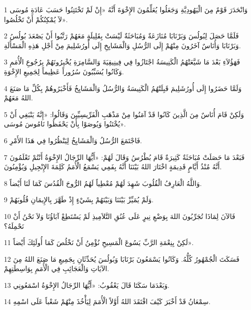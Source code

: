 \par 1 وَانْحَدَرَ قَوْمٌ مِنَ الْيَهُودِيَّةِ وَجَعَلُوا يُعَلِّمُونَ الإِخْوَةَ أَنَّهُ «إِنْ لَمْ تَخْتَتِنُوا حَسَبَ عَادَةِ مُوسَى لاَ يُمْكِنُكُمْ أَنْ تَخْلُصُوا».
\par 2 فَلَمَّا حَصَلَ لِبُولُسَ وَبَرْنَابَا مُنَازَعَةٌ وَمُبَاحَثَةٌ لَيْسَتْ بِقَلِيلَةٍ مَعَهُمْ رَتَّبُوا أَنْ يَصْعَدَ بُولُسُ وَبَرْنَابَا وَأُنَاسٌ آخَرُونَ مِنْهُمْ إِلَى الرُّسُلِ وَالْمَشَايِخِ إِلَى أُورُشَلِيمَ مِنْ أَجْلِ هَذِهِ الْمَسْأَلَةِ.
\par 3 فَهَؤُلاَءِ بَعْدَ مَا شَيَّعَتْهُمُ الْكَنِيسَةُ اجْتَازُوا فِي فِينِيقِيَةَ وَالسَّامِرَةِ يُخْبِرُونَهُمْ بِرُجُوعِ الْأُمَمِ وَكَانُوا يُسَبِّبُونَ سُرُوراً عَظِيماً لِجَمِيعِ الإِخْوَةِ.
\par 4 وَلَمَّا حَضَرُوا إِلَى أُورُشَلِيمَ قَبِلَتْهُمُ الْكَنِيسَةُ وَالرُّسُلُ وَالْمَشَايِخُ فَأَخْبَرُوهُمْ بِكُلِّ مَا صَنَعَ اللهُ مَعَهُمْ.
\par 5 وَلَكِنْ قَامَ أُنَاسٌ مِنَ الَّذِينَ كَانُوا قَدْ آمَنُوا مِنْ مَذْهَبِ الْفَرِّيسِيِّينَ وَقَالُوا: «إِنَّهُ يَنْبَغِي أَنْ يُخْتَنُوا وَيُوصَوْا بِأَنْ يَحْفَظُوا نَامُوسَ مُوسَى».
\par 6 فَاجْتَمَعَ الرُّسُلُ وَالْمَشَايِخُ لِيَنْظُرُوا فِي هَذَا الأَمْرِ.
\par 7 فَبَعْدَ مَا حَصَلَتْ مُبَاحَثَةٌ كَثِيرَةٌ قَامَ بُطْرُسُ وَقَالَ لَهُمْ: «أَيُّهَا الرِّجَالُ الإِخْوَةُ أَنْتُمْ تَعْلَمُونَ أَنَّهُ مُنْذُ أَيَّامٍ قَدِيمَةٍ اخْتَارَ اللهُ بَيْنَنَا أَنَّهُ بِفَمِي يَسْمَعُ الْأُمَمُ كَلِمَةَ الإِنْجِيلِ وَيُؤْمِنُونَ.
\par 8 وَاللَّهُ الْعَارِفُ الْقُلُوبَ شَهِدَ لَهُمْ مُعْطِياً لَهُمُ الرُّوحَ الْقُدُسَ كَمَا لَنَا أَيْضاً.
\par 9 وَلَمْ يُمَيِّزْ بَيْنَنَا وَبَيْنَهُمْ بِشَيْءٍ إِذْ طَهَّرَ بِالإِيمَانِ قُلُوبَهُمْ.
\par 10 فَالآنَ لِمَاذَا تُجَرِّبُونَ اللهَ بِوَضْعِ نِيرٍ عَلَى عُنُقِ التَّلاَمِيذِ لَمْ يَسْتَطِعْ آبَاؤُنَا وَلاَ نَحْنُ أَنْ نَحْمِلَهُ؟
\par 11 لَكِنْ بِنِعْمَةِ الرَّبِّ يَسُوعَ الْمَسِيحِ نُؤْمِنُ أَنْ نَخْلُصَ كَمَا أُولَئِكَ أَيْضاً».
\par 12 فَسَكَتَ الْجُمْهُورُ كُلُّهُ. وَكَانُوا يَسْمَعُونَ بَرْنَابَا وَبُولُسَ يُحَدِّثَانِ بِجَمِيعِ مَا صَنَعَ اللهُ مِنَ الآيَاتِ وَالْعَجَائِبِ فِي الْأُمَمِ بِوَاسِطَتِهِمْ.
\par 13 وَبَعْدَمَا سَكَتَا قَالَ يَعْقُوبُ: «أَيُّهَا الرِّجَالُ الإِخْوَةُ اسْمَعُونِي.
\par 14 سِمْعَانُ قَدْ أَخْبَرَ كَيْفَ افْتَقَدَ اللهُ أَوَّلاً الْأُمَمَ لِيَأْخُذَ مِنْهُمْ شَعْباً عَلَى اسْمِهِ.

